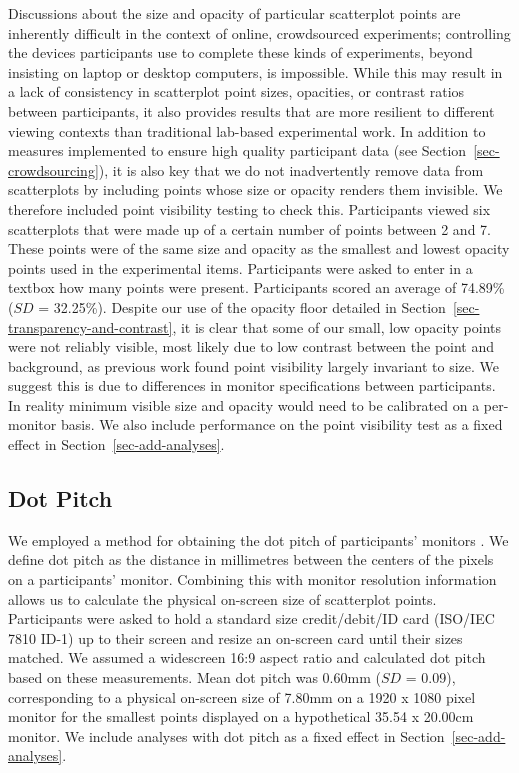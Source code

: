 \documentclass[manuscript, review, anonymous, screen]{acmart}
\begin{document}
Discussions about the size and opacity of particular scatterplot points
are inherently difficult in the context of online, crowdsourced
experiments; controlling the devices participants use to complete these
kinds of experiments, beyond insisting on laptop or desktop computers,
is impossible. While this may result in a lack of consistency in
scatterplot point sizes, opacities, or contrast ratios between
participants, it also provides results that are more resilient to
different viewing contexts than traditional lab-based experimental work.
In addition to measures implemented to ensure high quality participant
data (see Section~\ref{sec-crowdsourcing}), it is also key that we do
not inadvertently remove data from scatterplots by including points
whose size or opacity renders them invisible. We therefore included
point visibility testing to check this. Participants viewed six
scatterplots that were made up of a certain number of points between 2
and 7. These points were of the same size and opacity as the smallest
and lowest opacity points used in the experimental items. Participants
were asked to enter in a textbox how many points were present.
Participants scored an average of 74.89\% (\(SD\) = 32.25\%). Despite
our use of the opacity floor detailed in
Section~\ref{sec-transparency-and-contrast}, it is clear that some of
our small, low opacity points were not reliably visible, most likely due
to low contrast between the point and background, as previous work
\citep{strain_2023b} found point visibility largely invariant to size.
We suggest this is due to differences in monitor specifications between
participants. In reality minimum visible size and opacity would need to
be calibrated on a per-monitor basis. We also include performance on the
point visibility test as a fixed effect in
Section~\ref{sec-add-analyses}.

\hypertarget{sec-dot-pitch}{%
\subsection{Dot Pitch}\label{sec-dot-pitch}}

We employed a method for obtaining the dot pitch of participants'
monitors \citep{screenscale}. We define dot pitch as the distance in
millimetres between the centers of the pixels on a participants'
monitor. Combining this with monitor resolution information allows us to
calculate the physical on-screen size of scatterplot points.
Participants were asked to hold a standard size credit/debit/ID card
(ISO/IEC 7810 ID-1) up to their screen and resize an on-screen card
until their sizes matched. We assumed a widescreen 16:9 aspect ratio and
calculated dot pitch based on these measurements. Mean dot pitch was
0.60mm (\(SD\) = 0.09), corresponding to a physical on-screen size of
7.80mm on a 1920 x 1080 pixel monitor for the smallest points displayed
on a hypothetical 35.54 x 20.00cm monitor. We include analyses with dot
pitch as a fixed effect in Section~\ref{sec-add-analyses}.
\end{document}

